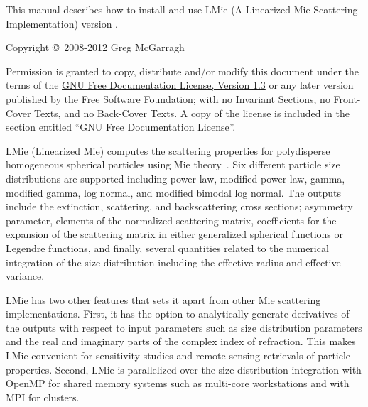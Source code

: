 %
\null
\iftth
\vspace{0.25in}
\else
\vfill
\fi
{
\setlength{\parskip}{7.5pt}

\noindent
This manual describes how to install and use LMie (A Linearized Mie Scattering Implementation) version \version.

\noindent
Copyright \copyright \ 2008-2012 Greg McGarragh

\noindent
Permission is granted to copy, distribute and/or modify this document under the terms of the \href{http://www.gnu.org/licenses/fdl-1.3.html}{GNU Free Documentation License, Version 1.3} or any later version published by the Free Software Foundation; with no Invariant Sections, no Front-Cover Texts, and no Back-Cover Texts.  A copy of the license is included in the section entitled ``GNU Free Documentation License''.
}


\tableofcontents


%
\mainmatter


\setlength{\parskip}{5.0pt}


\label{introduction_to_lmie}

LMie (Linearized Mie) computes the scattering properties for polydisperse homogeneous spherical particles using Mie theory~\citep{mie_gustav_1908}.  Six different particle size distributions are supported including power law, modified power law, gamma, modified gamma, log normal, and modified bimodal log normal.  The outputs include the extinction, scattering, and backscattering cross sections; asymmetry parameter, elements of the normalized scattering matrix, coefficients for the expansion of the scattering matrix in either generalized spherical functions or Legendre functions, and finally, several quantities related to the numerical integration of the size distribution including the effective radius and effective variance.  

LMie has two other features that sets it apart from other Mie scattering implementations.  First, it has the option to analytically generate derivatives of the outputs with respect to input parameters such as size distribution parameters and the real and imaginary parts of the complex index of refraction.  This makes LMie convenient for sensitivity studies and remote sensing retrievals of particle properties.  Second, LMie is parallelized over the size distribution integration with OpenMP for shared memory systems such as multi-core workstations and with MPI for clusters.

